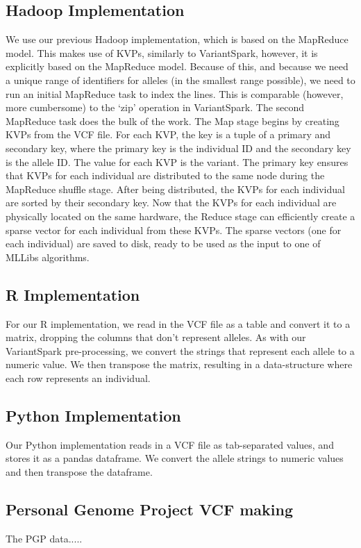 \documentclass{bmcart}
\newcommand{\variantSpark}{{\sc VariantSpark}}
\begin{document}
\subsection*{Hadoop Implementation}
We use our previous Hadoop implementation, which is based on the MapReduce model. This makes use of KVPs, similarly to \variantSpark{}, however, it is explicitly based on the MapReduce model.
Because of this, and because we need a unique range of identifiers for alleles (in the smallest range possible), we need to run an initial MapReduce task to index the lines. This is comparable (however, more cumbersome) to the `zip' operation in \variantSpark{}.
The second MapReduce task does the bulk of the work. The Map stage begins by creating KVPs from the VCF file. For each KVP, the key is a tuple of a primary and secondary key, where the primary key is the individual ID and the secondary key is the allele ID. The value for each KVP is the variant.
The primary key ensures that KVPs for each individual are distributed to the same node during the MapReduce shuffle stage. After being distributed, the KVPs for each individual are sorted by their secondary key.
Now that the KVPs for each individual are physically located on the same hardware, the Reduce stage can efficiently create a sparse vector for each individual from these KVPs. The sparse vectors (one for each individual) are saved to disk, ready to be used as the input to one of MLLibs algorithms.


\subsection*{R Implementation}
For our R implementation, we read in the VCF file as a table and convert it to a matrix, dropping the columns that don't represent alleles. As with our \variantSpark{} pre-processing, we convert the strings that represent each allele to a numeric value.
We then transpose the matrix, resulting in a data-structure where each row represents an individual.


\subsection*{Python Implementation}
Our Python implementation reads in a VCF file as tab-separated values, and stores it as a pandas dataframe. We convert the allele strings to numeric values and then transpose the dataframe. 


\subsection*{Personal Genome Project VCF making}
The PGP data..... 
\end{document}
